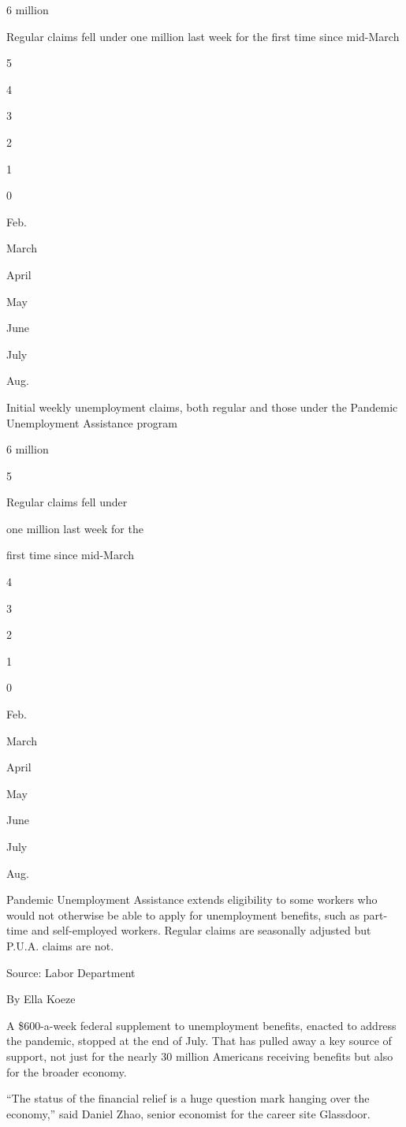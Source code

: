 6 million

Regular claims fell under one million last week for the first time since
mid-March

5

4

3

2

1

0

Feb.

March

April

May

June

July

Aug.

Initial weekly unemployment claims, both regular and those under the
Pandemic Unemployment Assistance program

6 million

5

Regular claims fell under

one million last week for the

first time since mid-March

4

3

2

1

0

Feb.

March

April

May

June

July

Aug.

Pandemic Unemployment Assistance extends eligibility to some workers who
would not otherwise be able to apply for unemployment benefits, such as
part-time and self-employed workers. Regular claims are seasonally
adjusted but P.U.A. claims are not.

Source: Labor Department

By Ella Koeze

A \$600-a-week federal supplement to unemployment benefits, enacted to
address the pandemic, stopped at the end of July. That has pulled away a
key source of support, not just for the nearly 30 million Americans
receiving benefits but also for the broader economy.

``The status of the financial relief is a huge question mark hanging
over the economy,'' said Daniel Zhao, senior economist for the career
site Glassdoor.

